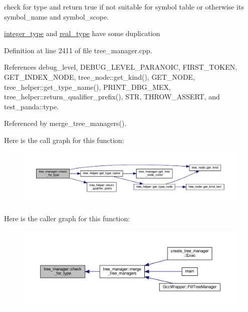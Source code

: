 check for type and return true if not suitable for symbol table or otherwise its symbol\+\_\+name and symbol\+\_\+scope. 

\hyperlink{structinteger__type}{integer\+\_\+type} and \hyperlink{structreal__type}{real\+\_\+type} have some duplication 

Definition at line 2411 of file tree\+\_\+manager.\+cpp.



References debug\+\_\+level, D\+E\+B\+U\+G\+\_\+\+L\+E\+V\+E\+L\+\_\+\+P\+A\+R\+A\+N\+O\+IC, F\+I\+R\+S\+T\+\_\+\+T\+O\+K\+EN, G\+E\+T\+\_\+\+I\+N\+D\+E\+X\+\_\+\+N\+O\+DE, tree\+\_\+node\+::get\+\_\+kind(), G\+E\+T\+\_\+\+N\+O\+DE, tree\+\_\+helper\+::get\+\_\+type\+\_\+name(), P\+R\+I\+N\+T\+\_\+\+D\+B\+G\+\_\+\+M\+EX, tree\+\_\+helper\+::return\+\_\+qualifier\+\_\+prefix(), S\+TR, T\+H\+R\+O\+W\+\_\+\+A\+S\+S\+E\+RT, and test\+\_\+panda\+::type.



Referenced by merge\+\_\+tree\+\_\+managers().

Here is the call graph for this function\+:
\nopagebreak
\begin{figure}[H]
\begin{center}
\leavevmode
\includegraphics[width=350pt]{d2/ddd/classtree__manager_ab5b9cbb2138f1682ff6c3f5c4650562e_cgraph}
\end{center}
\end{figure}
Here is the caller graph for this function\+:
\nopagebreak
\begin{figure}[H]
\begin{center}
\leavevmode
\includegraphics[width=350pt]{d2/ddd/classtree__manager_ab5b9cbb2138f1682ff6c3f5c4650562e_icgraph}
\end{center}
\end{figure}
\mbox{\label{classtree__manager_a6fae9da2246a0c0ea6fb1bdaeef7d54f}} 
